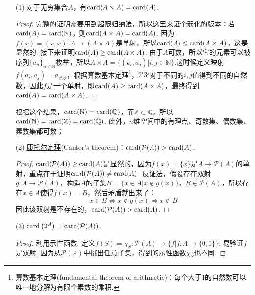 \documentclass[main.tex]{subfiles}
\begin{document}
\begin{itemize}
    \item [(1)] 对于无穷集合\(A\)，有\({\rm card}(A \times A) = {\rm card}(A)\).
    \begin{proof}
        完整的证明需要用到超限归纳法，所以这里来证个弱化的版本：若\({\rm card}(A)={\rm card}(\mathbb{N})\)，则\({\rm card}(A \times A) = {\rm card}(A)\).
        \newline
        因为\(f(x) = (x,x): A \to (A \times A)\)是单射，所以\({\rm card}(A) \leq {\rm card}(A \times A)\)，这是显然的. 接下来证明\({\rm card}(A) \geq {\rm card}(A \times A)\). 由于\(A\)可数，所以它的元素可以被序列\(\{a_n\}_{n \in \mathbb{N}}\)枚举，所以\(A \times A = \{(a_i, a_j)|i,j \in \mathbb{N}\}\).这时候定义映射\(f(a_i,a_j) = a_{2^i 3^j}\)，根据算数基本定理\footnote{算数基本定理(fundamental theorem of arithmetic)：每个大于\(1\)的自然数可以唯一地分解为有限个素数的乘积.}，\(2^i3^j\)对于不同的\(i,j\)值得到不同的自然数，因此\(f\)是一个单射，即\({\rm card}(A) \geq {\rm card}(A \times A)\)，最终得到\({\rm card}(A) = {\rm card}(A \times A)\).
    \end{proof}

    根据这个结果，\({\rm card}(\mathbb{N})={\rm card}(\mathbb{Q})\)，而\(\mathbb{Z} \subset \mathbb{Q}\)，所以\({\rm card}(\mathbb{N})={\rm card}(\mathbb{Z})={\rm card}(\mathbb{Q})\). 此外，\(n\)维空间中的有理点、奇数集、偶数集、素数集都可数；

    \item [(2)] \uline{康托尔定理}(Cantor's theorem)：\({\rm card}(\mathcal{P}(A)) > {\rm card}(A)\).
    \begin{proof}
        \({\rm card}(\mathcal{P}(A)) \geq {\rm card}(A)\)是显然的，因为\(f(x)=\{x\}\)是\(A \to \mathcal{P}(A)\)的单射，重点在于证明\({\rm card}(\mathcal{P}(A)) \neq {\rm card}(A)\). 反证法，假设存在双射\(g:A \to \mathcal{P}(A)\)，构造\(A\)的子集\(B=\{x \in A | x \not \in g(x)\}\)，\(B \in \mathcal{P}(A)\)，所以存在\(x \in A\)使得\(f(x)=B\)，然后矛盾就出来了：
        \[x \in B \Longleftrightarrow x \not \in g(x) \Longleftrightarrow x \not \in B\]
        因此该双射是不存在的，\({\rm card}(\mathcal{P}(A)) > {\rm card}(A)\).
    \end{proof}

    \item [(3)] \({\rm card}\left(2^A\right) = {\rm card}(\mathcal{P}(A))\).
    \begin{proof}
        利用示性函数. 定义\(f(S) = \chi_S:\mathcal{P}(A) \to \{f | f: A \to \{0,1\}\}\). 易验证\(f\)是双射. 因为从\(\mathcal{P}(A)\)中挑出任意子集，得到的示性函数\(\chi_S\)也不同.
    \end{proof}
\end{itemize}
\end{document}

